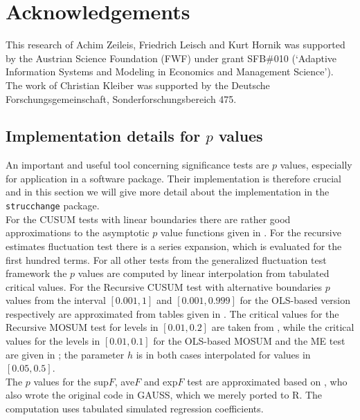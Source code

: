 \documentclass[10pt,a4paper]{article}
\begin{document}
\section*{Acknowledgements}

This research of Achim Zeileis, Friedrich Leisch and Kurt Hornik was supported
by the Austrian Science Foundation (FWF) under grant SFB\#010 (`Adaptive
Information Systems and Modeling in Economics and Management Science').\\
The work of Christian Kleiber was supported by the
Deutsche Forschungsgemeinschaft, Sonderforschungsbereich 475.

\newpage




\newpage
\begin{appendix}
\section{Implementation details for $p$ values}

An important and useful tool concerning significance tests are $p$ values,
especially for application in a software package. Their implementation is
therefore crucial and in this section we will give more detail about the
implementation in the {\tt strucchange} package.\\

For the CUSUM tests with linear boundaries there are rather good
approximations to the asymptotic $p$ value functions given in
\cite{Zo:Zeileis:2000a}. For the recursive estimates fluctuation test
there is a series expansion, which is evaluated for the first hundred terms. For
all other tests from the generalized fluctuation test framework the $p$ values
are computed by linear interpolation from tabulated critical values. For the
Recursive CUSUM test with alternative boundaries $p$ values from the interval
$[0.001, 1]$ and $[0.001, 0.999]$ for the OLS-based version respectively are
approximated from tables given in \cite{Zo:Zeileis:2000}. The critical values
for the Recursive MOSUM test for levels in $[0.01, 0.2]$ are taken from
\cite{Z:Chu+Hornik+Kuan:1995}, while the critical values for the levels
in $[0.01, 0.1]$ for the OLS-based MOSUM and the ME test are given in
\cite{Z:Chu+Hornik+Kuan:1995a}; the parameter $h$ is in both cases interpolated
for values in $[0.05, 0.5]$.\\

The $p$ values for the sup$F$, ave$F$ and exp$F$ test are approximated based on
\cite{Z:Hansen:1997}, who also wrote the original code in \textsf{GAUSS}, which
we merely ported to \textsf{R}. The computation uses tabulated simulated
regression coefficients.

\end{appendix}
\end{document}
